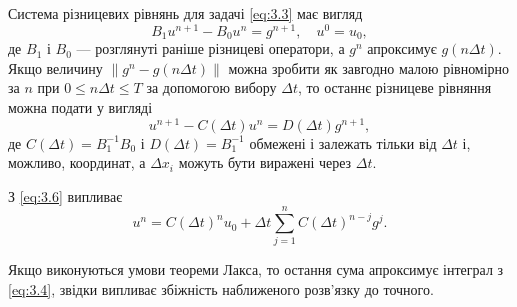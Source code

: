 Система різницевих рівнянь для задачі \eqref{eq:3.3} має вигляд
\begin{equation}
    B_1 u^{n + 1} - B_0 u^n = g^{n + 1}, \quad u^0 = u_0,
\end{equation}
де $B_1$ і $B_0$ --- розглянуті раніше різницеві оператори, а $g^n$ апроксимує $g(n \Delta t)$. Якщо величину $\|g^n - g(n \Delta t)\|$ можна зробити як завгодно малою рівномірно за $n$ при $0 \le n \Delta t \le T$ за допомогою вибору $\Delta t$, то останнє різницеве рівняння можна подати у вигляді
\begin{equation}
    \label{eq:3.6}
    u^{n + 1} - C(\Delta t) u^n = D(\Delta t) g^{n + 1},
\end{equation}
де $C(\Delta t) = B_1^{-1} B_0$ і $D(\Delta t) = B_1^{-1}$ обмежені і залежать тільки від $\Delta t$ і, можливо, координат, а $\Delta x_i$ можуть бути виражені через $\Delta t$. \medskip

З \eqref{eq:3.6} випливає
\begin{equation}
    u^n = C(\Delta t)^n u_0 + \Delta t \sum_{j = 1}^n C(\Delta t)^{n - j} g^j.
\end{equation}

Якщо виконуються умови теореми Лакса, то остання сума апроксимує інтеграл з \eqref{eq:3.4}, звідки випливає збіжність наближеного розв'язку до точного.

